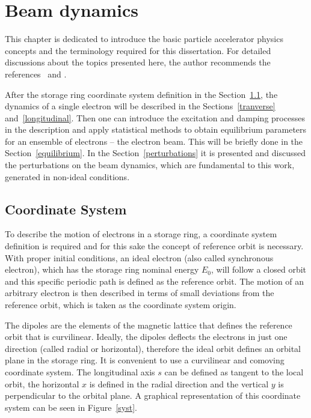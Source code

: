 \chapter{Beam dynamics}

This chapter is dedicated to introduce the basic particle accelerator physics concepts and the terminology required for this dissertation. For detailed discussions about the topics presented here, the author recommends the references~\cite{sands1970physics} and \cite{wiedemann2007physics}.

After the storage ring coordinate system definition in the Section~\ref{coord}, the dynamics of a single electron will be described in the Sections~\ref{tranverse} and~\ref{longitudinal}. Then one can introduce the excitation and damping processes in the description and apply statistical methods to obtain equilibrium parameters for an ensemble of electrons -- the electron beam. This will be briefly done in the Section~\ref{equilibrium}. In the Section~\ref{perturbations} it is presented and discussed the perturbations on the beam dynamics, which are fundamental to this work, generated in non-ideal conditions.

\section{Coordinate System}\label{coord}

To describe the motion of electrons in a storage ring, a coordinate system definition is required and for this sake the concept of reference orbit is necessary. With proper initial conditions, an ideal electron (also called synchronous electron), which has the storage ring nominal energy $E_0$, will follow a closed orbit and this specific periodic path is defined as the reference orbit. The motion of an arbitrary electron is then described in terms of small deviations from the reference orbit, which is taken as the coordinate system origin. 

The dipoles are the elements of the magnetic lattice that defines the reference orbit that is curvilinear. Ideally, the dipoles deflects the electrons in just one direction (called radial or horizontal), therefore the ideal orbit defines an orbital plane in the storage ring. It is convenient to use a curvilinear and comoving coordinate system. The longitudinal axis $s$ can be defined as tangent to the local orbit, the horizontal $x$ is defined in the radial direction and the vertical $y$ is perpendicular to the orbital plane. A graphical representation of this coordinate system can be seen in Figure~\ref{syst}.

